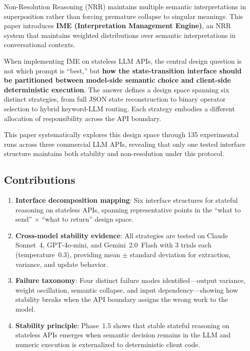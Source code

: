 \documentclass[11pt,a4paper]{article}
\begin{document}
Non-Resolution Reasoning (NRR) \cite{saito2025nrr,saito2026phi} maintains multiple semantic
interpretations in superposition rather than forcing premature collapse to singular meanings.
This paper introduces \textbf{IME (Interpretation Management Engine)}, an NRR system
that maintains weighted distributions over semantic interpretations in
conversational contexts.

When implementing IME on stateless LLM APIs, the central design question is not
which prompt is ``best,'' but \textbf{how the state-transition interface should
be partitioned between model-side semantic choice and client-side deterministic
execution}. The answer defines a design space spanning six distinct strategies,
from full JSON state reconstruction to binary operator selection to hybrid
keyword-LLM routing. Each strategy embodies a different allocation of
responsibility across the API boundary.

This paper systematically explores this design space through 135 experimental runs
across three commercial LLM APIs, revealing that only one tested interface
structure maintains both stability and non-resolution under this protocol.

\subsection{Contributions}

\begin{enumerate}
    \item \textbf{Interface decomposition mapping}: Six interface structures for
    stateful reasoning on stateless APIs, spanning representative points in the
    ``what to send'' $\times$ ``what to return'' design space.
    \item \textbf{Cross-model stability evidence}: All strategies are tested on
    Claude Sonnet~4, GPT-4o-mini, and Gemini~2.0~Flash with 3 trials each
    (temperature~0.3), providing mean $\pm$ standard deviation for extraction,
    variance, and update behavior.
    \item \textbf{Failure taxonomy}: Four distinct
    failure modes identified---output variance, weight oscillation, semantic
    collapse, and input dependency---showing how stability breaks when the API
    boundary assigns the wrong work to the model.
    \item \textbf{Stability principle}: Phase~1.5 shows that stable stateful
    reasoning on stateless APIs emerges when semantic decision remains in the
    LLM and numeric execution is externalized to deterministic client code.
\end{enumerate}
\end{document}
